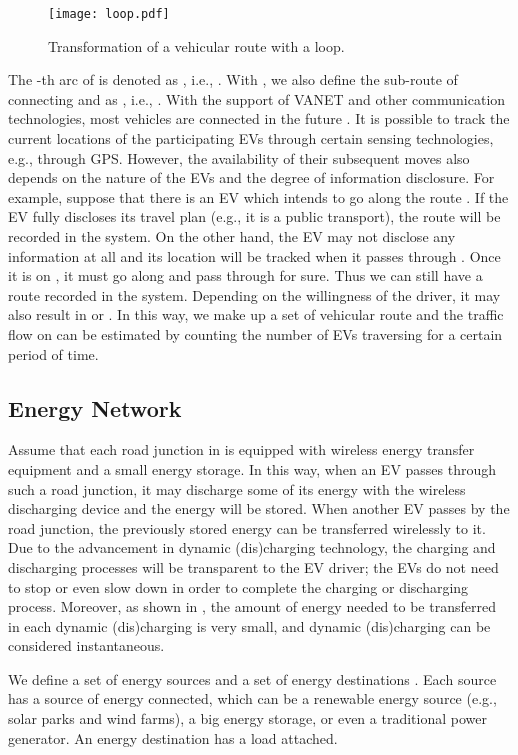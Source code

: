\documentclass[journal]{IEEEtran}
\begin{document}
\begin{figure}[!t]
\centering
\texttt{[image: loop.pdf]}
\caption{Transformation of a vehicular route with a loop.}
\label{fig:loop}
\end{figure}

The -th arc of  is denoted as , i.e., . With , we also define the sub-route of  connecting  and  as , i.e., .
With the support of VANET and other communication technologies, most vehicles are connected in the future \cite{connected}. It is possible to track the current locations of the participating EVs through certain sensing technologies, e.g., through GPS. However, the availability of their subsequent moves also depends on the nature of the EVs and the degree of information disclosure. For example, suppose that there is an EV which intends to go along the route . If the EV fully discloses its travel plan (e.g., it is a public transport), the route  will be recorded in the system. On the other hand, the EV may not disclose any information at all and its location will be tracked when it passes through . Once it is on , it must go along  and pass through  for sure. Thus we can still have a route  recorded in the system. Depending on the willingness of the driver, it may also result in  or . In this way, we make up a set of vehicular route  and the traffic flow  on  can be estimated by counting the number of EVs traversing  for a certain period of time.


\subsection{Energy Network} 

Assume that each road junction in  is equipped with wireless energy transfer equipment and a small energy storage. In this way, when an EV passes through such a road junction, it may discharge some of its energy with the wireless discharging device and the energy will be stored. When another EV passes by the road junction, the previously stored energy can be transferred wirelessly to it. Due to the advancement  in dynamic (dis)charging technology, the charging and discharging processes will be transparent to the EV driver; the EVs do not need to stop or even slow down in order to complete the charging or discharging process. Moreover, as shown in \cite{VEN}, the amount of energy needed to be transferred in each dynamic (dis)charging is very small, and dynamic (dis)charging can be considered instantaneous.

We define a set of energy sources  and a set of energy destinations . Each source  has a source of energy connected, which can be a renewable energy source (e.g., solar parks and wind farms), a big energy storage, or even a traditional power generator. An energy destination  has a load attached. 
\end{document}
